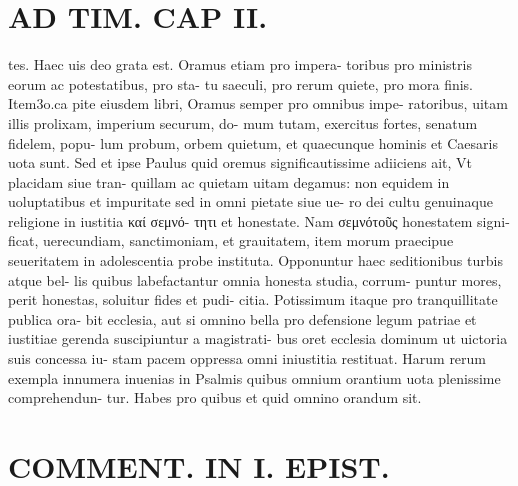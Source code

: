 \documentclass{article}
\begin{document}
\begin{pages}
\section*{AD TIM. CAP II. }
\marginpar{[ p.112 ]}\pstart tes. Haec uis deo grata est. Oramus etiam pro impera- toribus pro ministris eorum ac potestatibus, pro sta- tu saeculi, pro rerum quiete, pro mora finis. Item3o.ca pite eiusdem libri, Oramus semper pro omnibus impe- ratoribus, uitam illis prolixam, imperium securum, do- mum tutam, exercitus fortes, senatum fidelem, popu- lum probum, orbem quietum, et quaecunque hominis et Caesaris uota sunt. Sed et ipse Paulus quid oremus significautissime adiiciens ait, Vt placidam siue tran- quillam ac quietam uitam degamus: non equidem in uoluptatibus et impuritate sed in omni pietate siue ue- ro dei cultu genuinaque religione in iustitia καί σεμνό- τητι et honestate. Nam σεμνότοῦς honestatem signi- ficat, uerecundiam, sanctimoniam, et grauitatem, item morum praecipue seueritatem in adolescentia probe instituta. Opponuntur haec seditionibus turbis atque bel- lis quibus labefactantur omnia honesta studia, corrum- puntur mores, perit honestas, soluitur fides et pudi- citia. Potissimum itaque pro tranquillitate publica ora- bit ecclesia, aut si omnino bella pro defensione legum patriae et iustitiae gerenda suscipiuntur a magistrati- bus oret ecclesia dominum ut uictoria suis concessa iu- stam pacem oppressa omni iniustitia restituat. Harum rerum exempla innumera inuenias in Psalmis quibus omnium orantium uota plenissime comprehendun- tur. Habes pro quibus et quid omnino orandum sit.  \pend
\section*{COMMENT. IN I. EPIST. }
{}

\end{pages}
\end{document}

